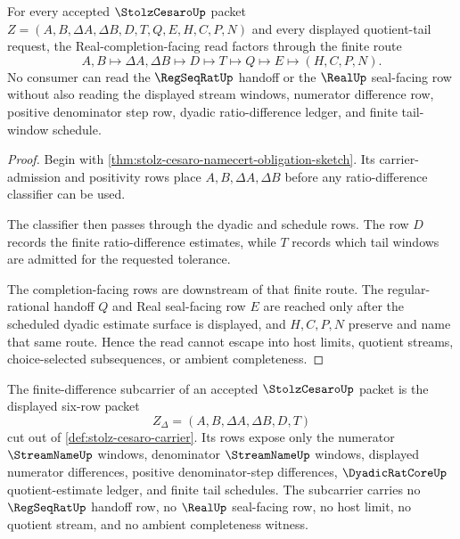 \begin{theorem}
\label{thm:stolz-cesaro-finite-tail-handoff}
For every accepted $\StolzCesaroUp$ packet $Z=(A,B,\Delta A,\Delta B,D,T,Q,E,H,C,P,N)$ and every displayed quotient-tail request, the Real-completion-facing read factors through the finite route
$$
A,B\longmapsto \Delta A,\Delta B\longmapsto D\longmapsto T\longmapsto Q\longmapsto E\longmapsto(H,C,P,N).
$$
No consumer can read the $\RegSeqRatUp$ handoff or the $\RealUp$ seal-facing row without also reading the displayed stream windows, numerator difference row, positive denominator step row, dyadic ratio-difference ledger, and finite tail-window schedule.
\end{theorem}
\begin{proof}
Begin with \autoref{thm:stolz-cesaro-namecert-obligation-sketch}. Its carrier-admission and positivity rows place $A,B,\Delta A,\Delta B$ before any ratio-difference classifier can be used.

The classifier then passes through the dyadic and schedule rows. The row $D$ records the finite ratio-difference estimates, while $T$ records which tail windows are admitted for the requested tolerance.

The completion-facing rows are downstream of that finite route. The regular-rational handoff $Q$ and Real seal-facing row $E$ are reached only after the scheduled dyadic estimate surface is displayed, and $H,C,P,N$ preserve and name that same route. Hence the read cannot escape into host limits, quotient streams, choice-selected subsequences, or ambient completeness.
\end{proof}

\begin{definition}
\label{def:stolz-cesaro-finite-difference-carrier}
The finite-difference subcarrier of an accepted $\StolzCesaroUp$ packet is the displayed six-row packet
$$
Z_{\Delta}=(A,B,\Delta A,\Delta B,D,T)
$$
cut out of \autoref{def:stolz-cesaro-carrier}. Its rows expose only the numerator $\StreamNameUp$ windows, denominator $\StreamNameUp$ windows, displayed numerator differences, positive denominator-step differences, $\DyadicRatCoreUp$ quotient-estimate ledger, and finite tail schedules. The subcarrier carries no $\RegSeqRatUp$ handoff row, no $\RealUp$ seal-facing row, no host limit, no quotient stream, and no ambient completeness witness.
\end{definition}

